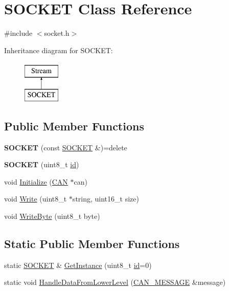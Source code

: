 \hypertarget{class_s_o_c_k_e_t}{\section{S\-O\-C\-K\-E\-T Class Reference}
\label{class_s_o_c_k_e_t}
}


{\ttfamily \#include $<$socket.\-h$>$}

Inheritance diagram for S\-O\-C\-K\-E\-T\-:\begin{figure}[H]
\begin{center}
\leavevmode
\includegraphics[height=2.000000cm]{class_s_o_c_k_e_t}
\end{center}
\end{figure}
\subsection*{Public Member Functions}
\begin{DoxyCompactItemize}
\item 
\hypertarget{class_s_o_c_k_e_t_a354625580716401ca8444fd01b99e89e}{{\bfseries S\-O\-C\-K\-E\-T} (const \hyperlink{class_s_o_c_k_e_t}{S\-O\-C\-K\-E\-T} \&)=delete}\label{class_s_o_c_k_e_t_a354625580716401ca8444fd01b99e89e}

\item 
\hypertarget{class_s_o_c_k_e_t_ab87e109918e43ba097c153114f4f6494}{{\bfseries S\-O\-C\-K\-E\-T} (uint8\-\_\-t \hyperlink{class_s_o_c_k_e_t_a0755fe74751c2d94d3d1679cad9e6544}{id})}\label{class_s_o_c_k_e_t_ab87e109918e43ba097c153114f4f6494}

\item 
void \hyperlink{class_s_o_c_k_e_t_a69219c6c89e78afcd46df2e0af34a341}{Initialize} (\hyperlink{class_c_a_n}{C\-A\-N} $\ast$can)
\item 
void \hyperlink{class_s_o_c_k_e_t_ad8ee6b81c9f30267406412a95264abed}{Write} (uint8\-\_\-t $\ast$string, uint16\-\_\-t size)
\item 
void \hyperlink{class_s_o_c_k_e_t_abcddb460b7adf3595a813f08f3659356}{Write\-Byte} (uint8\-\_\-t byte)
\end{DoxyCompactItemize}
\subsection*{Static Public Member Functions}
\begin{DoxyCompactItemize}
\item 
static \hyperlink{class_s_o_c_k_e_t}{S\-O\-C\-K\-E\-T} \& \hyperlink{class_s_o_c_k_e_t_acd81e49443c51d84f7bfe5d616d1b750}{Get\-Instance} (uint8\-\_\-t \hyperlink{class_s_o_c_k_e_t_a0755fe74751c2d94d3d1679cad9e6544}{id}=0)
\item 
static void \hyperlink{class_s_o_c_k_e_t_ab1345aded87c899fd525616b6f2cca4a}{Handle\-Data\-From\-Lower\-Level} (\hyperlink{struct_c_a_n___m_e_s_s_a_g_e}{C\-A\-N\-\_\-\-M\-E\-S\-S\-A\-G\-E} \&message)
\end{DoxyCompactItemize}
